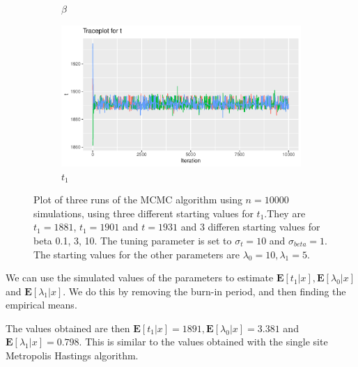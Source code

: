 \begin{figure}[H]
\begin{subfigure}[b]{0.49\textwidth}
        \caption{$\beta$ }
        \label{fig:sim_mixing_beta}
    \end{subfigure}
    \begin{subfigure}[b]{0.49\textwidth}
        \centering
        \includegraphics[width = \textwidth]{Images/mixing_t_block.pdf}
        \caption{$t_1$}
        \label{fig:sim_mixing_t}
    \end{subfigure}
    \caption{Plot of three runs of the MCMC algorithm using $n = 10000$ simulations, using three different starting values for $t_1$.They are $t_1 = 1881$, $t_1 = 1901$ and $t = 1931$ and 3 differen starting values for beta 0.1, 3, 10. The tuning parameter is set to $\sigma_t = 10$ and $\sigma_{beta} = 1$. The starting values for the other parameters are $\lambda_0 = 10, \lambda_1 = 5$.}
    \label{fig:sim_mixing}
\end{figure}








We can use the simulated values of the parameters to estimate $\mathbf{E}[t_1|x], \mathbf{E}[\lambda_0|x]$ and $\mathbf{E}[\lambda_1|x]$. We do this by removing the burn-in period, and then finding the empirical means. 



The values obtained are then $\mathbf{E}[t_1|x] = 1891, \mathbf{E}[\lambda_0|x] = 3.381 $ and $\mathbf{E}[\lambda_1|x] = 0.798 $. This is similar to the values obtained with the single site Metropolis Hastings algorithm. 


